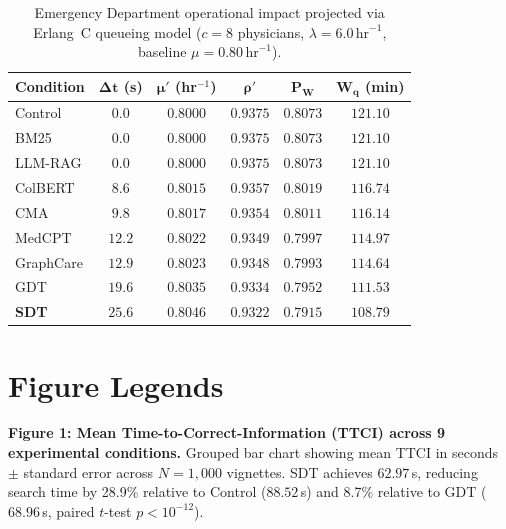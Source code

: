 \documentclass[12pt]{article}
\begin{document}
\begin{table}[h!]
  \centering
  \caption{Emergency Department operational impact projected via Erlang~C queueing model ($c=8$ physicians, $\lambda=6.0\,\text{hr}^{-1}$, baseline $\mu=0.80\,\text{hr}^{-1}$).}
  \label{tab:queueing_results}
  \small
  \begin{tabular}{@{}lccccc@{}}
    \toprule
    \textbf{Condition} & $\mathbf{\Delta t}$ \textbf{(s)} & $\mathbf{\mu'}$ \textbf{(hr}$^{-1}$\textbf{)} & $\mathbf{\rho'}$ & $\mathbf{P_W}$ & $\mathbf{W_q}$ \textbf{(min)} \\
    \midrule
    Control   & $0.0$  & $0.8000$ & $0.9375$ & $0.8073$ & $121.10$ \\
    BM25      & $0.0$  & $0.8000$ & $0.9375$ & $0.8073$ & $121.10$ \\
    LLM-RAG   & $0.0$  & $0.8000$ & $0.9375$ & $0.8073$ & $121.10$ \\
    ColBERT   & $8.6$  & $0.8015$ & $0.9357$ & $0.8019$ & $116.74$ \\
    CMA       & $9.8$  & $0.8017$ & $0.9354$ & $0.8011$ & $116.14$ \\
    MedCPT    & $12.2$ & $0.8022$ & $0.9349$ & $0.7997$ & $114.97$ \\
    GraphCare & $12.9$ & $0.8023$ & $0.9348$ & $0.7993$ & $114.64$ \\
    GDT       & $19.6$ & $0.8035$ & $0.9334$ & $0.7952$ & $111.53$ \\
    \midrule
    \textbf{SDT} & $\mathbf{25.6}$ & $\mathbf{0.8046}$ & $\mathbf{0.9322}$ & $\mathbf{0.7915}$ & $\mathbf{108.79}$ \\
    \bottomrule
  \end{tabular}
\end{table}

\newpage

\section*{Figure Legends}

\noindent
\textbf{Figure 1: Mean Time-to-Correct-Information (TTCI) across 9 experimental conditions.}
Grouped bar chart showing mean TTCI in seconds $\pm$ standard error across $N=1{,}000$ vignettes. SDT achieves $62.97$\,s, reducing search time by 28.9\% relative to Control ($88.52$\,s) and 8.7\% relative to GDT ($68.96$\,s, paired $t$-test $p < 10^{-12}$).
\end{document}
